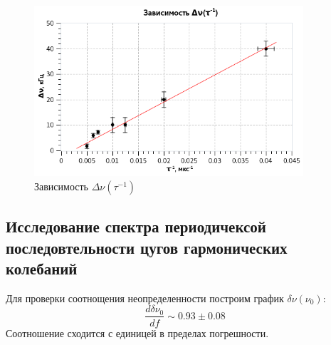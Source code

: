 \documentclass{article}
\begin{document}
   \begin{figure}[h!]
   \centering
   \includegraphics[width=10cm]{fig4.png} 
   \caption{Зависимость $\Delta \nu(\tau^{-1})$} 
   \label{fig.4} 
   \end{figure}
   
   \subsection*{Исследование спектра периодичексой последовтельности цугов гармонических колебаний}
   Для проверки соотнощения неопределенности построим график $\delta \nu(\nu_0)$:
   $$ \frac{d\delta \nu_0}{df} \sim 0.93 \pm 0.08 $$
   Соотношение сходится с единицей в пределах погрешности. 
\end{document}
